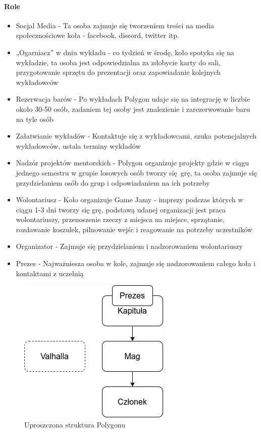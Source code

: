 \documentclass{article}[12pt]
\begin{document}
\paragraph{Role}
\begin{itemize}
\item Socjal Media - Ta osoba zajmuje się tworzeniem treści na media społecznościowe koła - facebook, discord, twitter itp.
\item „Ogarniacz” w dniu wykładu - co tydzień w środę, koło spotyka się na wykładzie, ta osoba jest odpowiedzialna za zdobycie karty do sali, przygotowanie sprzętu do prezentacji oraz zapowiadanie kolejnych wykładowców
\item Rezerwacja barów - Po wykładach Polygon udaje się na integrację w liczbie około 30-50 osób, zadaniem tej osoby jest znalezienie i zarezerwowanie baru na tyle osób
\item Załatwianie wykładów - Kontaktuje się z wykładowcami, szuka potencjalnych wykładowców, ustala terminy wykładów
\item Nadzór projektów mentorskich - Polygon organizuje projekty gdzie w ciągu jednego semestru w grupie losowych osób tworzy się grę, ta osoba zajmuje się przydzielaniem osób do grup i odpowiadaniem na ich potrzeby
\item Wolontariusz - Koło organizuje Game Jamy - imprezy podczas których w ciągu 1-3 dni tworzy się grę, podstawą udanej organizacji jest praca wolontariuszy, przenoszenie rzeczy z miejsca na miejsce, sprzątanie, rozdawanie koszulek, pilnowanie wejśc i reagowanie na potrzeby uczestników
\item Organizator - Zajmuje się przydzielaniem i nadzorowaniem wolontariuszy
\item Prezes - Najważniesza osoba w kole, zajmuje się nadzorowaniem całego koła i kontaktami z uczelnią
\end{itemize}
\begin{figure}[h]
\caption{Uproszczona struktura Polygonu}
\includegraphics[width=\textwidth]{polygon_org.drawio.png}
\end{figure}
\end{document}
